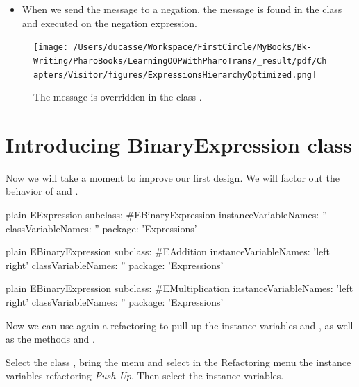 \documentclass[10pt,twoside,english]{_support/latex/sbabook/sbabook}
\begin{document}
\begin{itemize}
\item When we send the message  to a negation, the message is found in the class  and executed on the negation expression. 
\end{itemize}


\begin{figure}

\begin{center}
\texttt{[image: /Users/ducasse/Workspace/FirstCircle/MyBooks/Bk-Writing/PharoBooks/LearningOOPWithPharoTrans/\_result/pdf/Chapters/Visitor/figures/ExpressionsHierarchyOptimized.png]}\caption{The message  is overridden in the class .\label{fig:ExpressionsHierarchyOptimized}}\end{center}
\end{figure}

\section{Introducing BinaryExpression class}\label{secBinaryExpression}
Now we will take a moment to improve our first design. We will factor out the behavior of  and . 

\begin{displaycode}{plain}
EExpression subclass: #EBinaryExpression
	instanceVariableNames: ''
	classVariableNames: ''
	package: 'Expressions'
\end{displaycode}

\begin{displaycode}{plain}
EBinaryExpression subclass: #EAddition
	instanceVariableNames: 'left right'
	classVariableNames: ''
	package: 'Expressions'
\end{displaycode}

\begin{displaycode}{plain}
EBinaryExpression subclass: #EMultiplication
	instanceVariableNames: 'left right'
	classVariableNames: ''
	package: 'Expressions'
\end{displaycode}

Now we can use again a refactoring to pull up the instance variables  and , as well as the methods  and .

Select the class , bring the menu and select in the Refactoring menu the instance variables refactoring \textit{Push Up}. Then select the instance variables.
\end{document}
